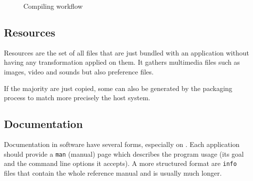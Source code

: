 \begin{figure}[htbp]
\centering
{}
\caption{Compiling workflow}
\label{fig:compiling_workflow}
\end{figure}


\subsection{Resources}

Resources are the set of all files that are just bundled with an
application without having any transformation applied on them. It
gathers multimedia files such as images, video and sounds but also
preference files.

If the majority are just copied, some can also be generated by the
packaging process to match more precisely the host system.


\subsection{Documentation}

Documentation in software have several forms, especially on
\linux. Each application should provide a \texttt{man} (manual) page
which describes the program usage (its goal and the command line
options it accepts). A more structured format are \texttt{info} files
that contain the whole reference manual and is usually much longer.


